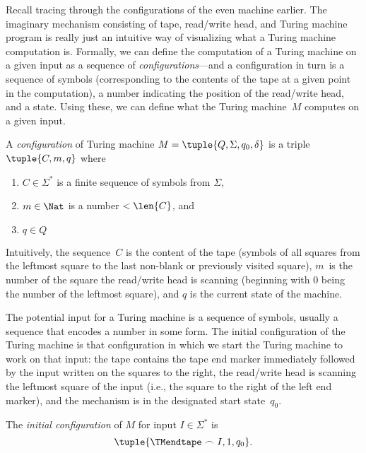 \documentclass[../../../include/open-logic-section]{subfiles}
\begin{document}

\begin{explain}
Recall tracing through the configurations of the even machine earlier.
The imaginary mechanism consisting of tape, read/write head, and
Turing machine program is really just an intuitive way of visualizing
what a Turing machine computation is.  Formally, we can define the
computation of a Turing machine on a given input as a sequence of
\emph{configurations}---and a configuration in turn is a sequence of
symbols (corresponding to the contents of the tape at a given point in
the computation), a number indicating the position of the read/write
head, and a state. Using these, we can define what the Turing
machine~$M$ computes on a given input.
\end{explain}

\begin{defn}[Configuration]
A \emph{configuration} of Turing machine $M = \tuple{Q, \Sigma, q_0,
\delta}$ is a triple $\tuple{C, m, q}$ where
\begin{enumerate}
\item $C \in \Sigma^*$ is a finite sequence of symbols from $\Sigma$,
\item $m \in \Nat$ is a number $< \len{C}$, and
\item $q \in Q$
\end{enumerate}
Intuitively, the sequence~$C$ is the content of the tape (symbols of
all squares from the leftmost square to the last non-blank or
previously visited square), $m$~is the number of the square the
read/write head is scanning (beginning with $0$ being the number of
the leftmost square), and $q$ is the current state of the machine.
\end{defn}

\begin{explain}
The potential input for a Turing machine is a sequence of symbols,
usually a sequence that encodes a number in some form.  The initial
configuration of the Turing machine is that configuration in which we
start the Turing machine to work on that input: the tape contains the
tape end marker immediately followed by the input written on the
squares to the right, the read/write head is scanning the leftmost
square of the input (i.e., the square to the right of the left end
marker), and the mechanism is in the designated start state~$q_0$.
\end{explain}

\begin{defn}
The \emph{initial configuration} of $M$ for input $I \in \Sigma^*$ is
\[
\tuple{\TMendtape \frown I, 1, q_0}.
\]
\end{defn}
\end{document}

